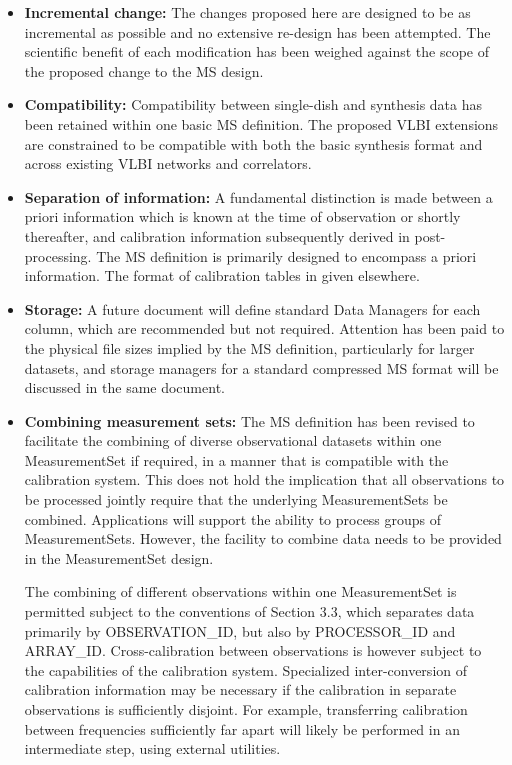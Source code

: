 \documentclass{article}
\begin{document}
\begin{itemize}

\item{{\bf Incremental change:} The changes proposed here are designed
to be as incremental as possible and no extensive re-design has been
attempted. The scientific benefit of each modification has been weighed
against the scope of the proposed change to the MS design.}

\item{{\bf Compatibility:} Compatibility between single-dish and
synthesis data has been retained within one basic MS definition. The
proposed VLBI extensions are constrained to be compatible with both
the basic synthesis format and across existing VLBI networks and
correlators.}

\item{{\bf Separation of information:} A fundamental distinction is
made between a priori information which is known at the time of
observation or shortly thereafter, and calibration information
subsequently derived in post-processing. The MS definition is
primarily designed to encompass a priori information. The format of
calibration tables in given elsewhere.}

\item{{\bf Storage:} A future document will define standard Data
Managers for each column, which are recommended but not
required. Attention has been paid to the physical file sizes implied
by the MS definition, particularly for larger datasets, and storage
managers for a standard compressed MS format will be discussed in the
same document.}

\item{{\bf Combining measurement sets:} The MS definition has been
revised to facilitate the combining of diverse observational datasets
within one MeasurementSet if required, in a manner that is compatible
with the calibration system. This does not hold the implication that
all observations to be processed jointly require that the underlying
MeasurementSets be combined. Applications will support the ability to
process groups of MeasurementSets. However, the facility to combine
data needs to be provided in the MeasurementSet design.

 The combining of different observations within one MeasurementSet
is permitted subject to the conventions of Section 3.3, which
separates data primarily by OBSERVATION\_ID, but also by
PROCESSOR\_ID and ARRAY\_ID. Cross-calibration between observations
is however subject to the capabilities of the calibration
system. Specialized inter-conversion of calibration information may be
necessary if the calibration in separate observations is sufficiently
disjoint. For example, transferring calibration between frequencies
sufficiently far apart will likely be performed in an intermediate
step, using external utilities.

}
\end{itemize}
\end{document}
